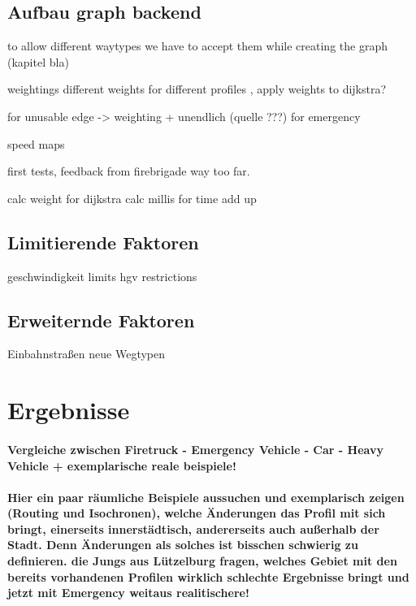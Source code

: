 \documentclass[12pt,a4paper]{article}
\begin{document}
\subsection{Aufbau graph backend}
\label{backendGraphBuild}

to allow different waytypes we have to accept them while creating the graph (kapitel bla)

weightings 
 different weights for different profiles , apply weights to dijkstra?
 
 for unusable edge -> weighting + unendlich (quelle ???)
 for emergency 
 
speed maps

first tests, feedback from firebrigade
way too far.

calc weight for dijkstra
calc millis for time add up



\subsection{Limitierende Faktoren}

geschwindigkeit limits
hgv restrictions

\subsection{Erweiternde Faktoren}

Einbahnstraßen
neue Wegtypen

\newpage
\section{Ergebnisse}
\paragraph{
Vergleiche zwischen Firetruck - Emergency Vehicle - Car - Heavy Vehicle
+ exemplarische reale beispiele!
}
\paragraph{
\color{red}
Hier ein paar räumliche Beispiele aussuchen und exemplarisch zeigen (Routing und Isochronen), welche Änderungen das Profil mit sich bringt, einerseits innerstädtisch, andererseits auch außerhalb der Stadt. Denn Änderungen als solches ist bisschen schwierig zu definieren. die Jungs aus Lützelburg fragen, welches Gebiet mit den bereits vorhandenen Profilen wirklich schlechte Ergebnisse bringt und jetzt mit Emergency weitaus realitischere!
}
\end{document}
